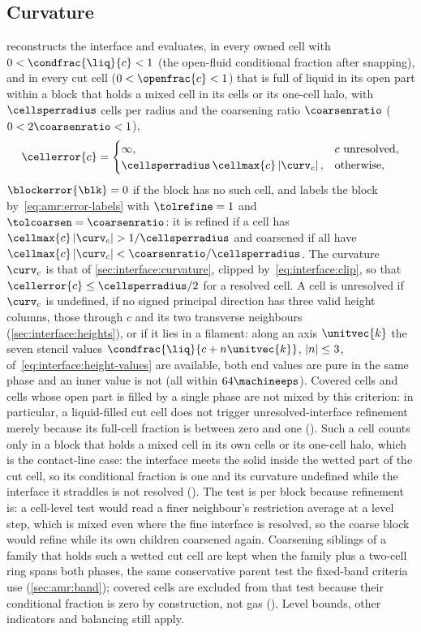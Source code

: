 \subsection{Curvature}\label{sec:amr:curvature}
 reconstructs the interface and
evaluates, in every owned cell with $0<\condfrac{\liq}{c}<1$ (the
open-fluid conditional fraction after snapping), and in every cut cell
($0<\openfrac{c}<1$) that is full of liquid in its open part within a block
that holds a mixed cell in its cells or its one-cell halo, with
$\cellsperradius$ cells per radius and the coarsening ratio $\coarsenratio$
($0<2\coarsenratio<1$),
\begin{equation}\label{eq:amr:curvature}
  \cellerror{c}=\begin{cases}
    \infty, & c\ \text{unresolved},\\
    \cellsperradius\,\cellmax{c}\abs{\curv_c}, & \text{otherwise},
  \end{cases}
\end{equation}
$\blockerror{\blk}=0$ if the block has no such cell, and labels the block
by~\cref{eq:amr:error-labels} with $\tolrefine=1$ and
$\tolcoarsen=\coarsenratio$: it is refined if a cell has
$\cellmax{c}\abs{\curv_c}>1/\cellsperradius$ and coarsened if all have
$\cellmax{c}\abs{\curv_c}<\coarsenratio/\cellsperradius$. The curvature
$\curv_c$ is that of \cref{sec:interface:curvature}, clipped
by~\cref{eq:interface:clip}, so that $\cellerror{c}\le\cellsperradius/2$ for a
resolved cell. A cell is unresolved if $\curv_c$ is undefined, if no signed
principal direction has three valid height columns, those through $c$ and its
two transverse neighbours (\cref{sec:interface:heights}), or if it lies in a
filament: along an axis $\unitvec{k}$ the seven stencil values
$\condfrac{\liq}{c+n\unitvec{k}}$, $\left\lvert n \right\rvert\le3$,
of~\cref{eq:interface:height-values} are available, both end values are pure
in the same phase and an inner value is not (all within $64\machineeps$).
Covered cells and cells whose open part is filled by a single phase are not
mixed by this criterion: in particular, a liquid-filled cut cell does not
trigger unresolved-interface refinement merely because its full-cell fraction
is between zero and one (). Such a cell counts only in a block that
holds a mixed cell in its own cells or its one-cell halo, which is the
contact-line case: the interface meets the solid inside the wetted part of the
cut cell, so its conditional fraction is one and its curvature undefined while
the interface it straddles is not resolved (). The test is per block
because refinement is: a cell-level test would read a finer neighbour's
restriction average at a level step, which is mixed even where the fine
interface is resolved, so the coarse block would refine while its own children
coarsened again. Coarsening siblings of a family that holds such a wetted cut
cell are kept when the family plus a two-cell ring spans both phases, the same
conservative parent test the fixed-band criteria use
(\cref{sec:amr:band}); covered cells are excluded from that test because
their conditional fraction is zero by construction, not gas
(). Level bounds, other indicators and balancing still apply.

